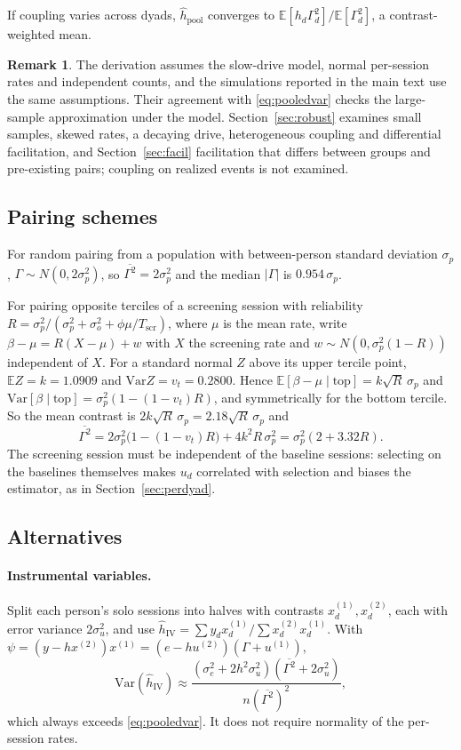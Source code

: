 \documentclass[12pt]{article}
\theoremstyle{definition}
\newtheorem{remark}[proposition]{Remark}
\begin{document}
If coupling varies across dyads, $\hat h_{\mathrm{pool}}$ converges to
$\mathbb{E}[h_d\Gamma_d^2]/\mathbb{E}[\Gamma_d^2]$, a contrast-weighted mean.

\begin{remark}
The derivation assumes the slow-drive model, normal per-session rates and
independent counts, and the simulations reported in the main text use the same
assumptions. Their agreement with \eqref{eq:pooledvar} checks the large-sample
approximation under the model. Section~\ref{sec:robust} examines small samples,
skewed rates, a decaying drive, heterogeneous coupling and differential facilitation,
and Section~\ref{sec:facil} facilitation that differs between groups and pre-existing
pairs; coupling on realized events is not examined.
\end{remark}

\subsection{Pairing schemes}

For random pairing from a population with between-person standard deviation
$\sigma_p$, $\Gamma\sim N(0,2\sigma_p^2)$, so $\overline{\Gamma^2}=2\sigma_p^2$ and the
median $|\Gamma|$ is $0.954\,\sigma_p$.

For pairing opposite terciles of a screening session with reliability
$R=\sigma_p^2/(\sigma_p^2+\sigma_o^2+\phi\mu/T_{\mathrm{scr}})$, where $\mu$ is the
mean rate, write $\beta-\mu=R(X-\mu)+w$ with $X$ the screening rate and
$w\sim N(0,\sigma_p^2(1-R))$ independent of $X$. For a standard normal $Z$ above
its upper tercile point, $\mathbb{E}Z=k=1.0909$ and $\mathrm{Var}Z=v_t=0.2800$. Hence
$\mathbb{E}[\beta-\mu\mid\text{top}]=k\sqrt R\,\sigma_p$ and
$\mathrm{Var}[\beta\mid\text{top}]=\sigma_p^2(1-(1-v_t)R)$, and symmetrically for the
bottom tercile. So the mean contrast is $2k\sqrt R\,\sigma_p=2.18\sqrt R\,\sigma_p$
and
\[
\overline{\Gamma^2}=2\sigma_p^2\bigl(1-(1-v_t)R\bigr)+4k^2R\,\sigma_p^2
=\sigma_p^2(2+3.32R).
\]
The screening session must be independent of the baseline sessions: selecting on
the baselines themselves makes $u_d$ correlated with selection and biases the
estimator, as in Section~\ref{sec:perdyad}.

\subsection{Alternatives}

\paragraph{Instrumental variables.} Split each person's solo sessions into halves
with contrasts $x^{(1)}_d,x^{(2)}_d$, each with error variance $2\sigma_u^2$, and use
$\hat h_{\mathrm{IV}}=\sum y_dx^{(1)}_d/\sum x^{(2)}_dx^{(1)}_d$. With
$\psi=(y-hx^{(2)})x^{(1)}=(e-hu^{(2)})(\Gamma+u^{(1)})$,
\[
\mathrm{Var}(\hat h_{\mathrm{IV}})\approx\frac{(\sigma_e^2+2h^2\sigma_u^2)(\overline{\Gamma^2}+2\sigma_u^2)}{n(\overline{\Gamma^2})^2},
\]
which always exceeds \eqref{eq:pooledvar}. It does not require normality of the
per-session rates.
\end{document}
